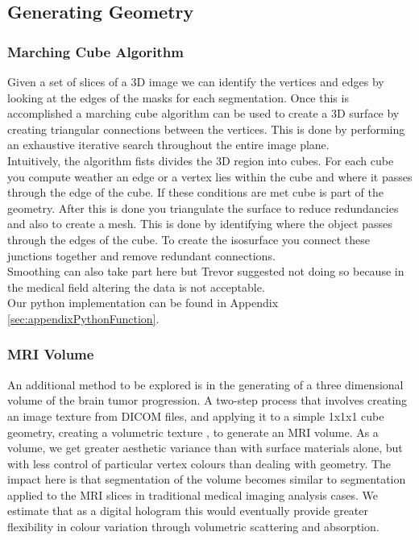  \subsection{Generating Geometry}

\subsubsection{Marching Cube Algorithm}
Given a set of slices of a 3D image we can identify the vertices and edges by looking at the edges of the masks for each segmentation.  Once this is accomplished a marching cube algorithm can be used to create a 3D surface by creating triangular connections between the vertices. This is done by performing an exhaustive iterative search throughout the entire image plane\cite{lorensen1987marching}.\\  

Intuitively, the algorithm fists divides the 3D region into cubes.  For each cube you compute weather an edge or a vertex lies within the cube and where it passes through the edge of the cube. If these conditions are met cube is part of the geometry.  After this is done you triangulate the surface to reduce redundancies and also to create a mesh. This is done by identifying where the object passes through the edges of the cube.  To create the isosurface you connect these junctions together and remove redundant connections.\\

Smoothing can also take part here but Trevor suggested not doing so because in the medical field altering the data is not acceptable.\\

Our python implementation can be found in Appendix \ref{sec:appendixPythonFunction}.

\subsubsection{MRI Volume}
An additional method to be explored is in the generating of a three dimensional volume of the brain tumor progression.  A two-step process that involves creating an image texture from DICOM files, and applying it to a simple 1x1x1 cube geometry, creating a volumetric texture \cite{voxeldata2019}, to generate an MRI volume. As a volume, we get greater aesthetic variance than with surface materials alone, but with less control of particular vertex colours than dealing with geometry.  The impact here is that segmentation of the volume becomes similar to segmentation applied to the MRI slices in traditional medical imaging analysis cases.  We estimate that as a digital hologram this would eventually provide greater flexibility in colour variation through volumetric scattering and absorption.\\

